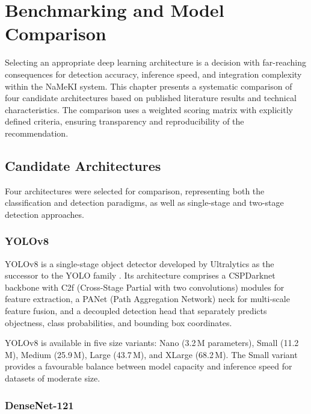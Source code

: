 \documentclass[a4paper,12pt,twoside]{report}
\begin{document}
\chapter{Benchmarking and Model Comparison}
\label{ch:benchmarking}

Selecting an appropriate deep learning architecture is a decision with
far-reaching consequences for detection accuracy, inference speed, and
integration complexity within the NaMeKI system. This chapter presents a
systematic comparison of four candidate architectures based on published
literature results and technical characteristics. The comparison uses a weighted
scoring matrix with explicitly defined criteria, ensuring transparency and
reproducibility of the recommendation.

\section{Candidate Architectures}
\label{sec:candidates}

Four architectures were selected for comparison, representing both the
classification and detection paradigms, as well as single-stage and two-stage
detection approaches.

\subsection{YOLOv8}

YOLOv8 \citep{jocher2023yolov8} is a single-stage object detector developed by
Ultralytics as the successor to the YOLO family \citep{redmon2016yolo}. Its
architecture comprises a CSPDarknet backbone with C2f (Cross-Stage Partial with
two convolutions) modules for feature extraction, a PANet (Path Aggregation
Network) neck for multi-scale feature fusion, and a decoupled detection head
that separately predicts objectness, class probabilities, and bounding box
coordinates.

YOLOv8 is available in five size variants: Nano (3.2\,M parameters), Small
(11.2\,M), Medium (25.9\,M), Large (43.7\,M), and XLarge (68.2\,M). The Small
variant provides a favourable balance between model capacity and inference speed
for datasets of moderate size.

\subsection{DenseNet-121}
\end{document}
